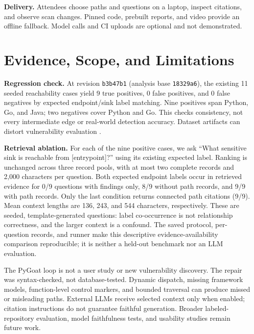 \documentclass[letterpaper]{article}
\begin{document}
\textbf{Delivery.}
Attendees choose paths and questions on a laptop, inspect citations, and
observe scan changes. Pinned code, prebuilt reports, and video provide an
offline fallback. Model calls and CI uploads are optional and not demonstrated.

\section{Evidence, Scope, and Limitations}
\textbf{Regression check.} At revision \texttt{b3b47b1} (analysis base
\texttt{18329a6}), the existing 11 seeded reachability cases yield 9 true
positives, 0 false positives, and 0 false negatives by expected endpoint/sink
label matching. Nine positives span Python, Go, and Java; two negatives cover
Python and Go. This checks consistency, not every intermediate edge or
real-world detection accuracy. Dataset artifacts can distort vulnerability
evaluation \citep{chakraborty2022}.

\textbf{Retrieval ablation.} For each of the nine positive cases, we ask
``What sensitive sink is reachable from [entrypoint]?'' using its existing
expected label. Ranking is unchanged across three record pools, with at most
two complete records and 2,000 characters per question. Both expected endpoint
labels occur in retrieved evidence for 0/9 questions with findings only, 8/9
without path records, and 9/9 with path records. Only the last condition
returns connected path citations (9/9). Mean context lengths are 136, 243,
and 544 characters, respectively. These are seeded, template-generated
questions: label co-occurrence is not relationship correctness, and the
larger context is a confound. The saved protocol, per-question records, and
runner make this descriptive evidence-availability comparison reproducible;
it is neither a held-out benchmark nor an LLM evaluation.

The PyGoat loop is not a user study or new vulnerability discovery. The repair
was syntax-checked, not database-tested. Dynamic dispatch, missing framework
models, function-level control markers, and bounded traversal can produce
missed or misleading paths. External LLMs receive selected context only when
enabled; citation instructions do not guarantee faithful generation. Broader
labeled-repository evaluation, model faithfulness tests, and usability studies
remain future work.


\end{document}

